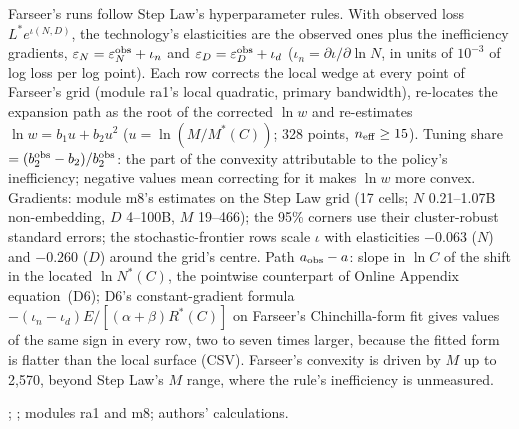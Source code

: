 \begin{table}[tp]
\begin{tablenotes}
Farseer's runs follow Step Law's hyperparameter rules. With observed loss $L^*e^{\iota(N,D)}$, the technology's elasticities are the observed ones plus the inefficiency gradients, $\varepsilon_N=\varepsilon_N^{\rm obs}+\iota_n$ and $\varepsilon_D=\varepsilon_D^{\rm obs}+\iota_d$ ($\iota_n=\partial\iota/\partial\ln N$, in units of $10^{-3}$ of log loss per log point). Each row corrects the local wedge at every point of Farseer's grid (module ra1's local quadratic, primary bandwidth), re-locates the expansion path as the root of the corrected $\ln w$ and re-estimates $\ln w=b_1u+b_2u^2$ ($u=\ln(M/M^*(C))$; 328 points, $n_{\rm eff}\ge15$). Tuning share $=(b_2^{\rm obs}-b_2)/b_2^{\rm obs}$: the part of the convexity attributable to the policy's inefficiency; negative values mean correcting for it makes $\ln w$ more convex. Gradients: module m8's estimates on the Step Law grid (17 cells; $N$ 0.21--1.07B non-embedding, $D$ 4--100B, $M$ 19--466); the 95\% corners use their cluster-robust standard errors; the stochastic-frontier rows scale $\iota$ with elasticities $-0.063$ ($N$) and $-0.260$ ($D$) around the grid's centre. Path $a_{\rm obs}-a$: slope in $\ln C$ of the shift in the located $\ln N^*(C)$, the pointwise counterpart of Online Appendix equation~(D6); D6's constant-gradient formula $-(\iota_n-\iota_d)E/[(\alpha+\beta)R^*(C)]$ on Farseer's Chinchilla-form fit gives values of the same sign in every row, two to seven times larger, because the fitted form is flatter than the local surface (CSV). Farseer's convexity is driven by $M$ up to 2,570, beyond Step Law's $M$ range, where the rule's inefficiency is unmeasured.
\end{tablenotes}

\begin{tablenotes}[Source]
\citet{li2025predictableb}; \citet{li2025predictablea}; modules ra1 and m8; authors' calculations.
\end{tablenotes}
\end{table}
